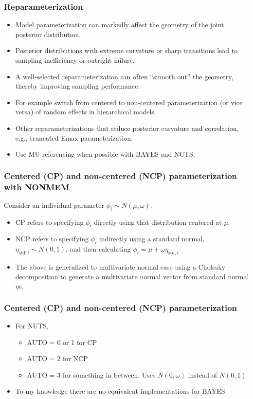 \documentclass{beamer}
\begin{document}
\begin{frame}
  \frametitle{Reparameterization}

  \begin{itemize}
  \item Model parameterization can markedly affect the geometry of the
    joint posterior distribution.
\item Posterior distributions with extreme curvature or sharp
  transitions lead to sampling inefficiency or outright failure.
\item A well-selected reparameterization can often ``smooth out'' the
  geometry, thereby improving sampling performance.
\item For example switch from centered to non-centered parameterization (or vice
  versa) of random effects in hierarchical models.
\item Other reparameterizations that reduce posterior curvature and
  correlation, e.g., truncated Emax parameterization.
\item Use MU referencing when possible with BAYES and NUTS.
\end{itemize}
  
\end{frame}

\begin{frame}
  \frametitle{Centered (CP) and non-centered (NCP) parameterization
    with NONMEM}
  
Consider an individual parameter $\phi_i \sim N(\mu, \omega)$.
\begin{itemize}
\item CP refers to specifying $\phi_i$ directly using that distribution
  centered at $\mu$.
\item NCP refers to specifying $\phi_i$ indirectly using a standard
  normal, $\eta_{\text{std},i} \sim N(0, 1)$, and
  then calculating $\phi_i = \mu + \omega \eta_{\text{std},i}$
\item The above is generalized  to multivariate normal case using a
  Cholesky decomposition to generate a multivariate normal vector from
  standard normal $\eta$s.
\end{itemize}

\end{frame}


\begin{frame}
  \frametitle{Centered (CP) and non-centered (NCP) parameterization}
  
  \begin{itemize}
  \item For NUTS, 
    \begin{itemize}
    \item AUTO = 0 or 1 for CP
      \item AUTO = 2 for NCP
 \item AUTO = 3 for something in between. Uses $N(0, \omega)$ instead
   of $N(0, 1)$
    \end{itemize}
\item To my knowledge there are no equivalent implementations for BAYES.
  \end{itemize}

\end{frame}
\end{document}
